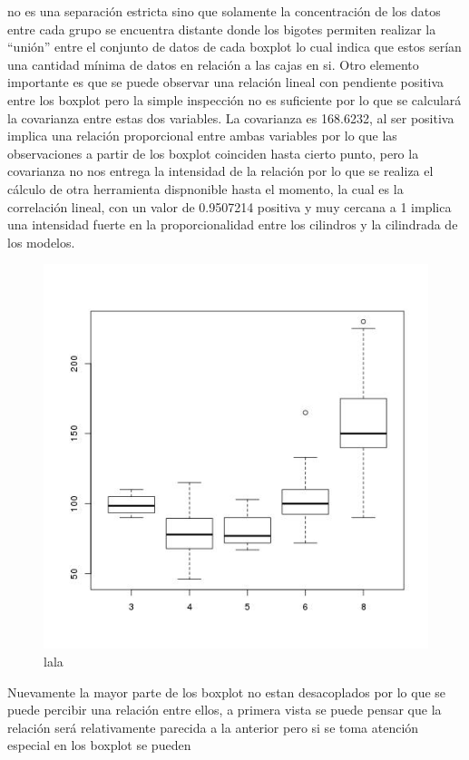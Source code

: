 \documentclass[letter,10pt]{article}
\begin{document}
no es una separación estricta sino que solamente la concentración de los datos entre cada grupo se encuentra distante donde los bigotes
permiten realizar la ``unión'' entre el conjunto de datos de cada boxplot lo cual indica que estos serían una cantidad mínima
de datos en relación a las cajas en si.
Otro elemento importante es que se puede observar una relación lineal con pendiente positiva entre los boxplot pero
la simple inspección no es suficiente por lo que se calculará la covarianza entre estas dos variables. La covarianza es
168.6232, al ser positiva implica una relación proporcional entre ambas variables por lo que las observaciones a partir
de los boxplot coinciden hasta cierto punto, pero la covarianza no nos entrega la intensidad de la relación por lo que se realiza
el cálculo de otra herramienta dispnonible hasta el momento, la cual es la correlación lineal, con un valor de 0.9507214
positiva y muy cercana a 1 implica una intensidad fuerte en la proporcionalidad entre los cilindros y la cilindrada de los modelos.
\begin{figure}[h!]
    \centering
    \includegraphics[scale=0.4]{boxplot_horsepower_cylinders.jpg}
    \caption{lala}
    \label{fig:lala}
\end{figure}
Nuevamente la mayor parte de los boxplot no estan desacoplados por lo que se puede percibir una relación entre ellos, a primera
vista se puede pensar que la relación será relativamente parecida a la anterior pero si se toma atención especial en los boxplot se pueden
\end{document}
